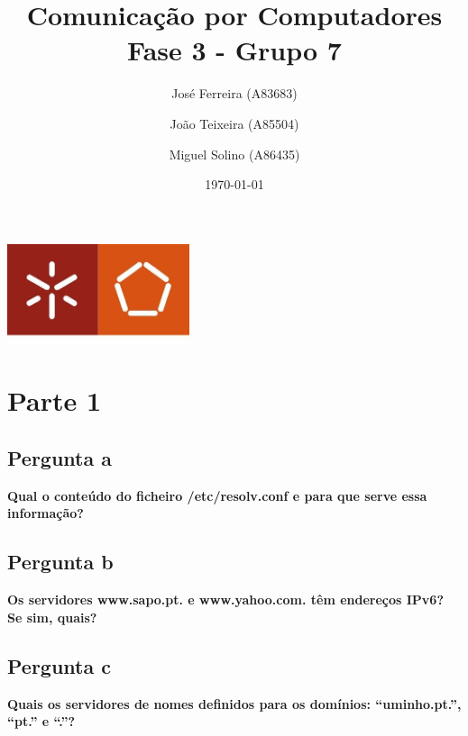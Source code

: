 \documentclass[a4paper]{report}
\begin{document}
\title{Comunicação por Computadores\\ 
\large Fase 3 - Grupo 7}
\author{José Ferreira (A83683) \and João Teixeira (A85504) \and Miguel Solino (A86435)}
\date{\today}

\begin{center}
    \begin{minipage}{0.75\linewidth}
        \centering
        \includegraphics[width=0.4\textwidth]{images/eng.jpeg}\par\vspace{1cm}
        \vspace{1.5cm}
        \href{https://www.uminho.pt/PT}
        {\color{black}{\scshape\LARGE Universidade do Minho}} \par
        \vspace{1cm}
        \href{https://www.di.uminho.pt/}
        {\color{black}{\scshape\Large Departamento de Informática}} \par
        \vspace{1.5cm}
        \maketitle
    \end{minipage}
\end{center}

\chapter{Parte 1}
\section{Pergunta a}
\textbf{Qual o conteúdo do ficheiro /etc/resolv.conf e para que serve essa
informação?}

\section{Pergunta b}
\textbf{Os servidores www.sapo.pt. e www.yahoo.com. têm endereços IPv6? Se sim,
quais?}

\section{Pergunta c}
\textbf{Quais os servidores de nomes definidos para os domínios: “uminho.pt.”,
“pt.” e “.”?}
\end{document}

